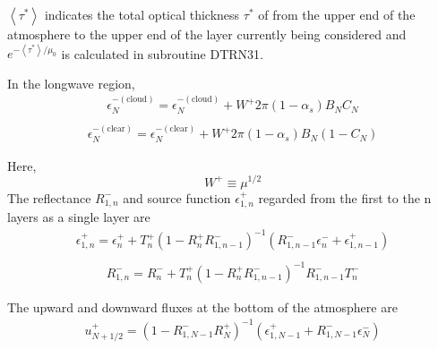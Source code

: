 \(\left\langle\tau^{*}\right\rangle\) indicates the total optical
thickness \(\tau^{*}\) of from the upper end of the atmosphere to the
upper end of the layer currently being considered and
\(e^{-\left\langle\tau^{*}\right\rangle / \mu_{0}}\) is calculated in
subroutine DTRN31.

In the longwave region, \begin{equation}
\begin{array}{l}
\epsilon_{N}^{-(\text {cloud})}=\epsilon_{N}^{-(\text {cloud})}+W^{+} 2 \pi\left(1-\alpha_{s}\right) B_{N} C_{N} \\
\end{array}
\end{equation} \begin{equation}
\begin{array}{l}
\epsilon_{N}^{-(\text {clear})}=\epsilon_{N}^{-(\text {clear})}+W^{+} 2 \pi\left(1-\alpha_{s}\right) B_{N}\left(1-C_{N}\right)
\end{array}
\end{equation}

Here, \begin{equation}
W^{+} \equiv \mu^{1 / 2}
\end{equation} The reflectance \(R_{1, n}^{-}\) and source function
\(\epsilon_{1, n}^{+}\) regarded from the first to the n layers as a
single layer are \begin{equation}
\begin{array}{l}
\epsilon_{1, n}^{+}=\epsilon_{n}^{+}+T_{n}^{+}\left(1-R_{n}^{+} R_{1, n-1}^{-}\right)^{-1}\left(R_{1, n-1}^{-} \epsilon_{n}^{-}+\epsilon_{1, n-1}^{+}\right) \\
\end{array}
\end{equation} \begin{equation}
\begin{array}{l}
R_{1, n}^{-}=R_{n}^{-}+T_{n}^{+}\left(1-R_{n}^{+} R_{1, n-1}^{-}\right)^{-1} R_{1, n-1}^{-} T_{n}^{-}
\end{array}
\end{equation}

The upward and downward fluxes at the bottom of the atmosphere are \begin{equation}
\begin{array}{l}
u_{N+1 / 2}^{+}=\left(1-R_{1, N-1}^{-} R_{N}^{+}\right)^{-1}\left(\epsilon_{1, N-1}^{+}+R_{1, N-1}^{-} \epsilon_{N}^{-}\right) \\
\end{array}
\end{equation}

